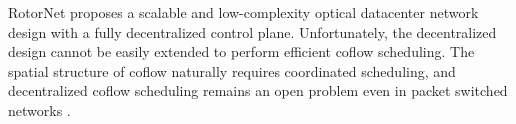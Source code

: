 RotorNet \cite{rotornet} proposes a scalable and low-complexity optical datacenter network design
with a fully decentralized control plane. Unfortunately, the decentralized design cannot be easily extended to perform efficient coflow scheduling. The spatial structure of coflow naturally requires coordinated scheduling, and
decentralized coflow scheduling remains an open problem even in packet switched networks \cite{aalo}.


